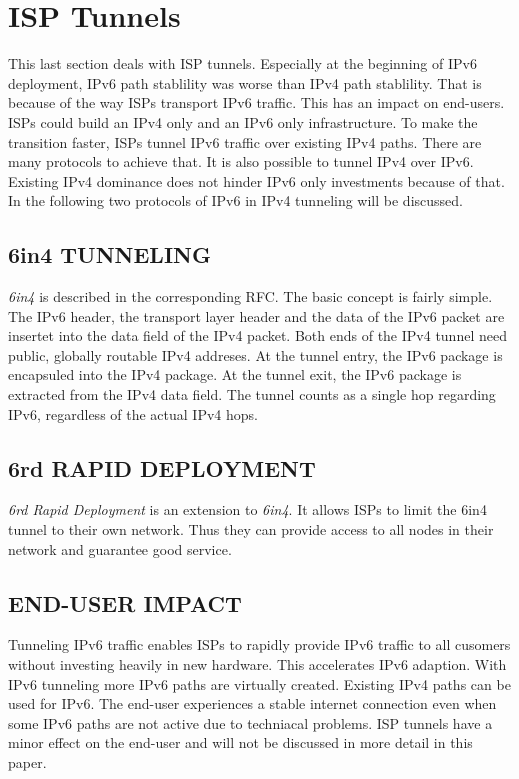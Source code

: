 \documentclass[format=sigconf, natbib=true, nonacm=true]{acmart}
\begin{document}
    \section{ISP Tunnels}
    This last section deals with ISP tunnels. Especially at the beginning of IPv6 deployment, IPv6 path stablility was worse than IPv4 path stablility\cite{7119767}. That is because of the way ISPs transport IPv6 traffic. This has an impact on end-users. ISPs could build an IPv4 only and an IPv6 only infrastructure. To make the transition faster, ISPs tunnel IPv6 traffic over existing IPv4 paths. There are many protocols to achieve that. It is also possible to tunnel IPv4 over IPv6. Existing IPv4 dominance does not hinder IPv6 only investments because of that. In the following two protocols of IPv6 in IPv4 tunneling will be discussed.
    \subsection{6in4 TUNNELING}
    \textit{6in4} is described in the corresponding RFC\cite{rfc4213}. The basic concept is fairly simple. The IPv6 header, the transport layer header and the data of the IPv6 packet are insertet into the data field of the IPv4 packet. Both ends of the IPv4 tunnel need public, globally routable IPv4 addreses. At the tunnel entry, the IPv6 package is encapsuled into the IPv4 package. At the tunnel exit, the IPv6 package is extracted from the IPv4 data field. The tunnel counts as a single hop regarding IPv6, regardless of the actual IPv4 hops.
    \subsection{6rd RAPID DEPLOYMENT}
    \textit{6rd Rapid Deployment} is an extension to \textit{6in4}. It allows ISPs to limit the 6in4 tunnel to their own network. Thus they can provide access to all nodes in their network and guarantee good service.
    \subsection*{END-USER IMPACT}
    Tunneling IPv6 traffic enables ISPs to rapidly provide IPv6 traffic to all cusomers without investing heavily in new hardware. This accelerates IPv6 adaption. With IPv6 tunneling more IPv6 paths are virtually created. Existing IPv4 paths can be used for IPv6. The end-user experiences a stable internet connection even when some IPv6 paths are not active due to techniacal problems. ISP tunnels have a minor effect on the end-user and will not be discussed in more detail in this paper.
\end{document}
